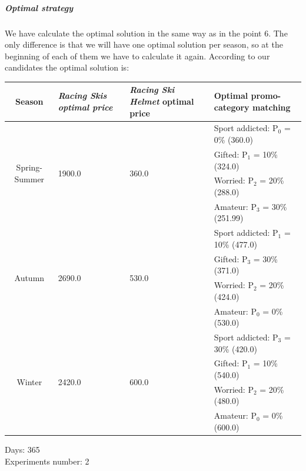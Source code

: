 \subparagraph{Optimal strategy}
We have calculate the optimal solution in the same way as in the point 6. The only difference is that we will have one optimal solution per season, so at the beginning of each of them we have to calculate it again.
According to our candidates the optimal solution is:

\begin{center}
	\begin{tabular}{|c|p{4cm}|p{4cm}|p{4cm}|} 
		\hline
		Season & \textit{Racing Skis optimal price} & \textit{Racing Ski Helmet} optimal price & Optimal promo-category matching \\ \hline
		\multirow{4}{*}{Spring-Summer} & \multirow{4}{*}{1900.0} & \multirow{4}{*}{360.0} & Sport addicted: P$_0$ = 0\% (360.0)  \\ 
		& 					   &                      & Gifted: P$_1$ = 10\% (324.0)          \\ 
		& 					   &                      & Worried: P$_2$ = 20\% (288.0)         \\
		& 					   &                      & Amateur: P$_3$ = 30\% (251.99)         \\ \hline
		\multirow{4}{*}{Autumn} & \multirow{4}{*}{2690.0} & \multirow{4}{*}{530.0}  & Sport addicted: P$_1$ = 10\% (477.0)\\ 
		& 					   &                      & Gifted: P$_3$ = 30\% (371.0)         \\ 
		& 					   &                      & Worried: P$_2$ = 20\% (424.0)         \\
		& 					   &                      & Amateur: P$_0$ = 0\% (530.0)         \\ \hline
		\multirow{4}{*}{Winter} & \multirow{4}{*}{2420.0} & \multirow{4}{*}{600.0}  & Sport addicted: P$_3$ = 30\% (420.0)\\ 
		& 					   &                      & Gifted: P$_1$ = 10\% (540.0)         \\ 
		& 					   &                      & Worried: P$_2$ = 20\% (480.0)         \\
		& 					   &                      & Amateur: P$_0$ = 0\% (600.0)          \\ \hline
	\end{tabular}
\end{center}

Days: 365\\
Experiments number: 2 \\





